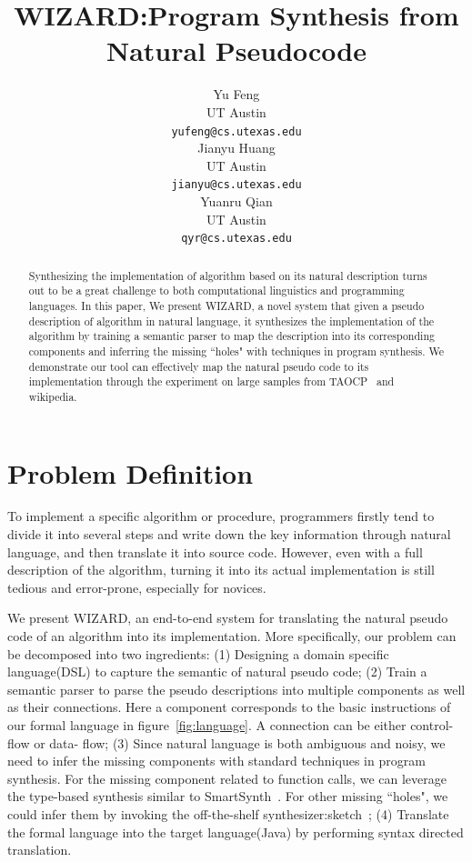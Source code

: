 \documentclass[11pt]{article}
\title{WIZARD:Program Synthesis from Natural Pseudocode}
\author{Yu Feng \\
  UT Austin \\
  {\tt yufeng@cs.utexas.edu} \\\And
  Jianyu Huang \\
  UT Austin \\
  {\tt jianyu@cs.utexas.edu}  \\\And
    Yuanru Qian \\
  UT Austin \\
  {\tt qyr@cs.utexas.edu} \\}
\date{}
\begin{document}
\maketitle
\begin{abstract}
  Synthesizing the implementation of algorithm based on its 
  natural description turns out to be a great challenge to both 
  computational linguistics and programming languages. In this paper,
  We present WIZARD, a novel system that given a pseudo description 
  of algorithm in natural language, it synthesizes the 
  implementation of the algorithm by training a semantic parser to map
  the description into its corresponding components and 
  inferring the missing ``holes" with techniques in program synthesis.  
  We demonstrate our tool can effectively
  map the natural pseudo code to its implementation through the
  experiment on large samples from TAOCP~\cite{knuth1998art} and wikipedia.
\end{abstract}

\section{Problem Definition}
To implement a specific algorithm or procedure, programmers firstly tend to 
divide it into several steps and write down the key information through
natural language, and then translate it into source code. However, even 
with a full description of the algorithm, turning it into its actual 
implementation is still tedious and error-prone, especially for novices.

We present WIZARD, an end-to-end system for translating the natural pseudo code
of an algorithm into its implementation. More specifically,
our problem can be decomposed into two ingredients: (1) Designing a domain 
specific language(DSL) to capture the semantic of natural pseudo code; 
(2) Train a semantic parser
 to parse the pseudo descriptions into multiple components as well as their connections. Here a 
 component corresponds to the basic instructions of our formal language in figure~\ref{fig:language}.
 A connection can be either control- flow or data- flow;
 (3) Since natural language is both ambiguous and noisy, we need to infer the missing 
 components with standard techniques in program synthesis. For the missing component
 related to function calls, we can leverage the type-based synthesis similar to SmartSynth~\cite{smartsyn}.
 For other missing ``holes", we could infer them by invoking the off-the-shelf synthesizer:sketch~\cite{sketch};
 (4) Translate the formal language into the target language(Java) by performing 
 syntax directed translation. 
  
\end{document}
